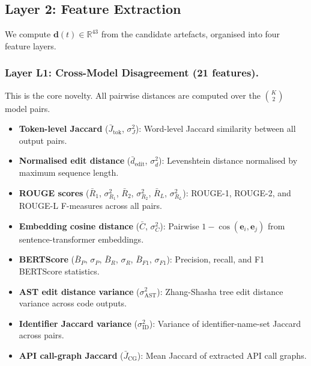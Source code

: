 \documentclass[11pt,a4paper]{article}
\begin{document}
\subsection{Layer 2: Feature Extraction}
\label{sec:features}

We compute $\mathbf{d}(t) \in \mathbb{R}^{43}$ from the candidate artefacts, organised into four feature layers.

\subsubsection{Layer L1: Cross-Model Disagreement (21 features).}
This is the core novelty. All pairwise distances are computed over the $\binom{K}{2}$ model pairs.

\begin{itemize}
\item \textbf{Token-level Jaccard} ($\bar{J}_\mathrm{tok}$, $\sigma^2_J$): Word-level Jaccard similarity between all output pairs.
\item \textbf{Normalised edit distance} ($\bar{d}_\mathrm{edit}$, $\sigma^2_d$): Levenshtein distance normalised by maximum sequence length.
\item \textbf{ROUGE scores} ($\bar{R}_1$, $\sigma^2_{R_1}$, $\bar{R}_2$, $\sigma^2_{R_2}$, $\bar{R}_L$, $\sigma^2_{R_L}$): ROUGE-1, ROUGE-2, and ROUGE-L F-measures across all pairs.
\item \textbf{Embedding cosine distance} ($\bar{C}$, $\sigma^2_C$): Pairwise $1 - \cos(\mathbf{e}_i, \mathbf{e}_j)$ from sentence-transformer embeddings.
\item \textbf{BERTScore} ($\bar{B}_P$, $\sigma_P$, $\bar{B}_R$, $\sigma_R$, $\bar{B}_{F1}$, $\sigma_{F1}$): Precision, recall, and F1 BERTScore statistics.
\item \textbf{AST edit distance variance} ($\sigma^2_\mathrm{AST}$): Zhang-Shasha tree edit distance variance across code outputs.
\item \textbf{Identifier Jaccard variance} ($\sigma^2_\mathrm{ID}$): Variance of identifier-name-set Jaccard across pairs.
\item \textbf{API call-graph Jaccard} ($\bar{J}_\mathrm{CG}$): Mean Jaccard of extracted API call graphs.
\end{itemize}
\end{document}

